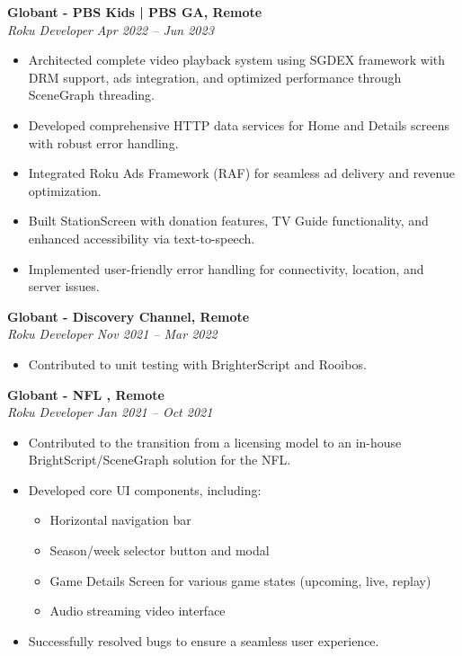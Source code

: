\documentclass[11pt,a4paper]{article}
\newlength{\jobspacing}
\begin{document}
\vspace{\jobspacing}

\textbf{Globant - PBS Kids | PBS GA, Remote} \\
\emph{Roku Developer} \hfill \textit{Apr 2022 -- Jun 2023} \\
\begin{itemize}[leftmargin=*]
    \item Architected complete video playback system using SGDEX framework with DRM support, ads integration, and optimized performance through SceneGraph threading.
    \item Developed comprehensive HTTP data services for Home and Details screens with robust error handling.
    \item Integrated Roku Ads Framework (RAF) for seamless ad delivery and revenue optimization.
    \item Built StationScreen with donation features, TV Guide functionality, and enhanced accessibility via text-to-speech.
    \item Implemented user-friendly error handling for connectivity, location, and server issues.
\end{itemize}

\vspace{\jobspacing}

\textbf{Globant - Discovery Channel, Remote} \\
\emph{Roku Developer} \hfill \textit{Nov 2021 -- Mar 2022} \\
\begin{itemize}[leftmargin=*]
    \item Contributed to unit testing with BrighterScript and Rooibos.
\end{itemize}

\vspace{\jobspacing}

\textbf{Globant - NFL , Remote} \\
\emph{Roku Developer} \hfill \textit{Jan 2021 -- Oct 2021} \\
\begin{itemize}[leftmargin=*]
    \item Contributed to the transition from a licensing model to an in-house BrightScript/SceneGraph solution for the NFL.
    \item Developed core UI components, including:
    \begin{itemize}[leftmargin=*]
        \item Horizontal navigation bar
        \item Season/week selector button and modal
        \item Game Details Screen for various game states (upcoming, live, replay)
        \item Audio streaming video interface
    \end{itemize}
    \item Successfully resolved bugs to ensure a seamless user experience.
\end{itemize}
\end{document}
